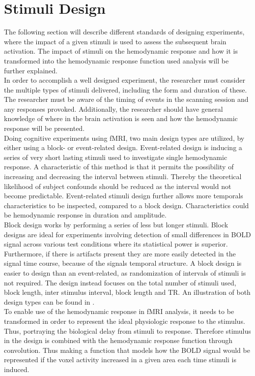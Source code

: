 \section{Stimuli Design} \label{sec:Stim}

The following section will describe different standards of designing experiments, where the impact of a given stimuli is used to assess the subsequent brain activation. The impact of stimuli on the hemodynamic response and how it is transformed into the hemodynamic response function used analysis will be further explained. \\
In order to accomplish a well designed experiment, the researcher must consider the multiple types of stimuli delivered, including the form and duration of these. The researcher must be aware of the timing of events in the scanning session and any responses provoked. Additionally, the researcher should have general knowledge of where in the brain activation is seen and how the hemodynamic response will be presented. \cite{Moayedi2018} \\
Doing cognitive experiments using fMRI, two main design types are utilized, by either using a block- or event-related design. Event-related design is inducing a series of very short lasting stimuli used to investigate single hemodynamic response. A characteristic of this method is that it permits the possibility of increasing and decreasing the interval between stimuli. Thereby the theoretical likelihood of subject confounds should be reduced as the interval would not become predictable. Event-related stimuli design further allows more temporals characteristics to be inspected, compared to a block design. Characteristics could be hemodynamic response in duration and amplitude. \cite{Chee2003}  \\
Block design works by performing a series of less but longer stimuli. Block designs are ideal for experiments involving detection of small differences in BOLD signal across various test conditions where its statistical power is superior. Furthermore, if there is artifacts present they are more easily detected in the signal time course, because of the signals temporal structure. A block design is easier to design than an event-related, as randomization of intervals of stimuli is not required. The design instead focuses on the total number of stimuli used, block length, inter stimulus interval, block length and TR. An illustration of both design types can be found in . \cite{Chee2003}  \\     
To enable use of the hemodynamic response in fMRI analysis, it needs to be transformed in order to represent the ideal physiologic response to the stimulus. Thus, portraying the biological delay from stimuli to response. Therefore stimulus in the design is combined with the hemodynamic response function through convolution. Thus making a function that models how the BOLD signal would be represented if the voxel activity increased in a given area each time stimuli is induced. \cite{Moayedi2018}

